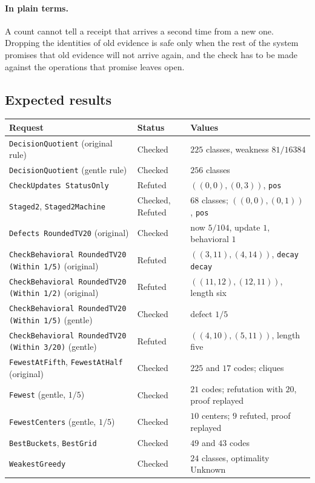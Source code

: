\documentclass[11pt]{article}
\newcommand{\code}[1]{\texttt{#1}}
\newcommand{\plain}{\paragraph{In plain terms.}}
\theoremstyle{definition}
\theoremstyle{plain}
\begin{document}
\plain A count cannot tell a receipt that arrives a second time from a new one. Dropping the
identities of old evidence is safe only when the rest of the system promises that old evidence will
not arrive again, and the check has to be made against the operations that promise leaves open.

\subsection{Expected results}

\begin{longtable}{>{\raggedright\arraybackslash}p{6.3cm}l>{\raggedright\arraybackslash}p{5.2cm}}
\toprule
Request & Status & Values\\
\midrule
\endhead
\code{DecisionQuotient} (original rule) & Checked & $225$ classes, weakness $81/16384$\\
\code{DecisionQuotient} (gentle rule) & Checked & $256$ classes\\
\code{CheckUpdates StatusOnly} & Refuted & $((0,0),(0,3))$, \code{pos}\\
\code{Staged2}, \code{Staged2Machine} & Checked, Refuted & $68$ classes; $((0,0),(0,1))$, \code{pos}\\
\code{Defects RoundedTV20} (original) & Checked & now $5/104$, update $1$, behavioral $1$\\
\code{CheckBehavioral RoundedTV20 (Within 1/5)} (original) & Refuted & $((3,11),(4,14))$, \code{decay decay}\\
\code{CheckBehavioral RoundedTV20 (Within 1/2)} (original) & Refuted & $((11,12),(12,11))$, length six\\
\code{CheckBehavioral RoundedTV20 (Within 1/5)} (gentle) & Checked & defect $1/5$\\
\code{CheckBehavioral RoundedTV20 (Within 3/20)} (gentle) & Refuted & $((4,10),(5,11))$, length five\\
\code{FewestAtFifth}, \code{FewestAtHalf} (original) & Checked & $225$ and $17$ codes; cliques\\
\code{Fewest} (gentle, $1/5$) & Checked & $21$ codes; refutation with $20$, proof replayed\\
\code{FewestCenters} (gentle, $1/5$) & Checked & $10$ centers; $9$ refuted, proof replayed\\
\code{BestBuckets}, \code{BestGrid} & Checked & $49$ and $43$ codes\\
\code{WeakestGreedy} & Checked & $24$ classes, optimality Unknown\\

\end{longtable}
\end{document}
